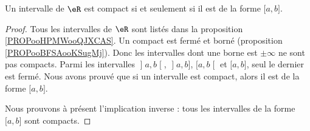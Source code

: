 \begin{theorem}   \label{ThoBOrelLebesgue}
    Un intervalle de \( \eR\) est compact si et seulement si il est de la forme \( \mathopen[ a , b \mathclose]\).
\end{theorem}

\begin{proof}
    Tous les intervalles de \( \eR\) sont listés dans la proposition \ref{PROPooHPMWooQJXCAS}. Un compact est fermé et borné (proposition \ref{PROPooBFSAooKSugMj}). Donc les intervalles dont une borne est \( \pm\infty\) ne sont pas compacts. Parmi les intervalles \( \mathopen] a , b \mathclose[\), \( \mathopen] a , b \mathclose]\), \( \mathopen[ a , b \mathclose[\) et \( \mathopen[ a , b \mathclose]\), seul le dernier est fermé. Nous avons prouvé que si un intervalle est compact, alors il est de la forme \( \mathopen[ a , b \mathclose]\). 

    Nous prouvons à présent l'implication inverse : tous les intervalles de la forme \( \mathopen[ a , b \mathclose]\) sont compacts.


\end{proof}
